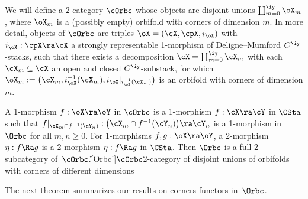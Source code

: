 \documentclass{article}
\begin{document}
\begin{dfn} We will define a 2-category $\cOrbc$ whose objects are
disjoint unions $\coprod_{m=0}^\iy \oX_m$, where $\oX_m$ is a
(possibly empty) orbifold with corners of dimension $m$. In more
detail, objects of $\cOrbc$ are triples $\oX=(\cX,\cpX,i_\oX)$ with
$i_\oX:\cpX\ra\cX$ a strongly representable 1-morphism of
Deligne--Mumford $C^\iy$-stacks, such that there exists a
decomposition $\cX=\coprod_{m=0}^\iy\cX_m$ with each
$\cX_m\subseteq\cX$ an open and closed $C^\iy$-substack, for which
$\oX_m:=\bigl(\cX_m,i_\oX^{-1}(\cX_m),i_\oX\vert_{\smash{i_\oX^{-1}
(\cX_m)}}\bigr)$ is an orbifold with corners of dimension $m$.

A 1-morphism $f:\oX\ra\oY$ in $\cOrbc$ is a 1-morphism $f:\cX\ra\cY$
in $\CSta$ such that $f\vert_{\cX_m\cap
f^{-1}(\cY_n)}:\bigl(\cX_m\cap f^{-1}(\cY_n)\bigr)\ra \cY_n$ is a
1-morphism in $\Orbc$ for all $m,n\ge 0$. For 1-morphisms
$f,g:\oX\ra\oY$, a 2-morphism $\eta:f\Ra g$ is a 2-morphism
$\eta:f\Ra g$ in $\CSta$. Then $\Orbc$ is a full 2-subcategory
of~$\cOrbc$.\G[Orbc']{$\cOrbc$}{2-category of disjoint unions of
orbifolds with corners of different dimensions}
\label{ds12def5}
\end{dfn}

The next theorem summarizes our results on corners functors
in~$\Orbc$.
\end{document}

